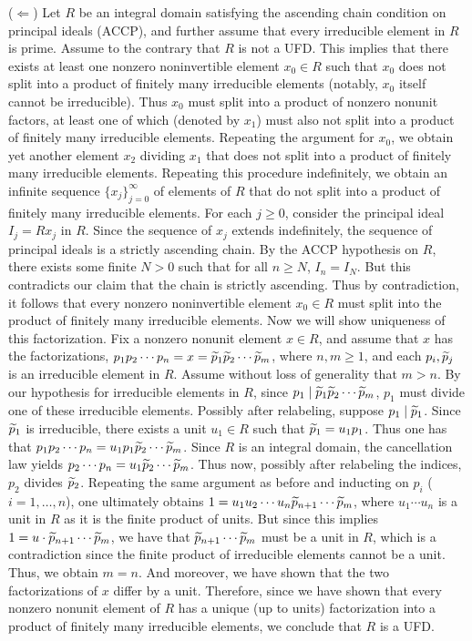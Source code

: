 \documentclass{article}
\begin{document}
	($\Longleftarrow$) Let $R$ be an integral domain satisfying the ascending chain condition on principal ideals (ACCP), and further assume that every irreducible element in $R$ is prime. Assume to the contrary that $R$ is not a UFD. This implies that there exists at least one nonzero noninvertible element $x_{0} \in R$ such that $x_{0}$ does not split into a product of finitely many irreducible elements (notably, $x_{0}$ itself cannot be irreducible). Thus $x_{0}$ must split into a product of nonzero nonunit factors, at least one of which (denoted by $x_1$) must also not split into a product of finitely many irreducible elements. Repeating the argument for $x_0$, we obtain yet another element $x_2$ dividing $x_1$ that does not split into a product of finitely many irreducible elements. Repeating this procedure indefinitely, we obtain an infinite sequence $\{x_{j}\}_{j = 0}^{\infty}$ of elements of $R$ that do not split into a product of finitely many irreducible elements. For each $j \geq 0$, consider the principal ideal $I_{j} = Rx_{j}$ in $R$. Since the sequence of $x_j$ extends indefinitely, the sequence of principal ideals is a strictly ascending chain. By the ACCP hypothesis on $R$, there exists some finite $N > 0$ such that for all $n \geq N$, $I_{n} = I_{N}$. But this contradicts our claim that the chain is strictly ascending. Thus by contradiction, it follows that every nonzero noninvertible element $x_{0} \in R$ must split into the product of finitely many irreducible elements. Now we will show uniqueness of this factorization. Fix a nonzero nonunit element $x \in R$, and assume that $x$ has the factorizations, $p_{1}p_{2}\dotsm p_{n} = x = \widetilde{p}_{1}\widetilde{p}_{2}\dotsm \widetilde{p}_{m}$, where $n, m \geq 1$, and each $p_{i}, \widetilde{p}_{j}$ is an irreducible element in $R$. Assume without loss of generality that $m > n$. By our hypothesis for irreducible elements in $R$, since $p_{1} \mid \widetilde{p}_{1}\widetilde{p}_{2}\dotsm \widetilde{p}_{m}$, $p_{1}$ must divide one of these irreducible elements. Possibly after relabeling, suppose $p_{1} \mid \widetilde{p}_{1}$. Since $\widetilde{p}_{1}$ is irreducible, there exists a unit $u_{1} \in R$ such that $\widetilde{p}_{1} = u_{1} p_{1}$. Thus one has that $p_{1}p_{2}\dotsm p_{n} = u_{1}p_{1}\widetilde{p}_{2}\dotsm \widetilde{p}_{m}$. Since $R$ is an integral domain, the cancellation law yields $p_{2}\dotsm p_{n} = u_{1}\widetilde{p}_{2}\dotsm \widetilde{p}_{m}$. Thus now, possibly after relabeling the indices, $p_{2}$ divides $\widetilde{p}_{2}$. Repeating the same argument as before and inducting on $p_{i}$ ($i = 1, \ldots, n$), one ultimately obtains $1 = u_{1}u_{2}\dotsm u_{n}\widetilde{p}_{n + 1}\dotsm \widetilde{p}_{m}$, where $u_{1}\dotsm u_{n}$ is a unit in $R$ as it is the finite product of units. But since this implies $1 = u \cdot \widetilde{p}_{n + 1} \dotsm \widetilde{p}_{m}$, we have that $\widetilde{p}_{n + 1}\dotsm\widetilde{p}_{m}$ must be a unit in $R$, which is a contradiction since the finite product of irreducible elements cannot be a unit. Thus, we obtain $m = n$. And moreover, we have shown that the two factorizations of $x$ differ by a unit. Therefore, since we have shown that every nonzero nonunit element of $R$ has a unique (up to units) factorization into a product of finitely many irreducible elements, we conclude that $R$ is a UFD. 
	
\end{document}

